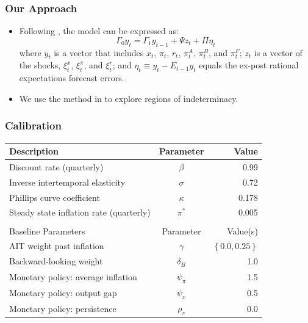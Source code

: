 \documentclass{beamer}
\begin{document}
\begin{frame}
	\frametitle{Our Approach}
	\begin{itemize}
		\setlength{\itemsep}{1em}
		\item Following \citet{sims2002}, the model can be expressed as:
		\begin{equation}
			\Gamma_0 y_t = \Gamma_1 y_{t-1} + \Psi z_t + \Pi \eta_t
		\end{equation}
		where $y_t$ is a vector that includes $x_t$, $\pi_t$, $r_t$, $\pi_t^A$, $\pi_t^B$, and $\pi_t^F$; $z_t$ is a vector of the shocks, $\xi_t^x$, $\xi_t^\pi$, and $\xi_t^r$; and $\eta_t \equiv y_t - E_{t-1} y_t$ equals the ex-post rational expectations forecast errors. 
		\item We use the method in \citet{sims2002} to explore regions of indeterminacy.
	\end{itemize}
\end{frame}

\begin{frame}
	\frametitle{Calibration}
	\begin{table}[htp]
		\begin{center}
			\vspace*{-1pc}\begin{tabular}{lcr}
				Description & Parameter & Value \\ \hline
				Discount rate (quarterly) & $\beta$ & 0.99 \\
				Inverse intertemporal elasticity & $\sigma$ & 0.72 \\
				Phillips curve coefficient & $\kappa$ & 0.178 \\
				Steady state inflation rate (quarterly) & $\pi^*$ & 0.005 \\ [0.25pc]
				\hline \\ [-0.25pc]
				Baseline Parameters & Parameter & Value(s) \\ \hline
				AIT weight past inflation & $\gamma$ & $\left\{ 0.0, 0.25 \right\}$ \\
				Backward-looking weight & $\delta_B$ & 1.0 \\
				Monetary policy: average inflation & $\psi_\pi$ & 1.5 \\
				Monetary policy: output gap & $\psi_x$ & 0.5 \\
				Monetary policy: persistence & $\rho_r$ & 0.0 \\ \hline
			\end{tabular}
		\end{center}
	\end{table}
\end{frame}
\end{document}
